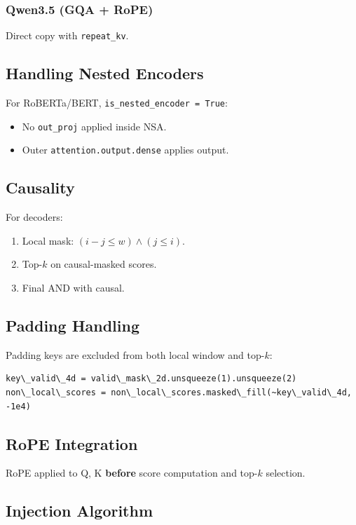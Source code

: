 \subsubsection{Qwen3.5 (GQA + RoPE)}

Direct copy with \texttt{repeat\_kv}.

\subsection{Handling Nested Encoders}

For RoBERTa/BERT, \texttt{is\_nested\_encoder = True}:
\begin{itemize}
\item No \texttt{out\_proj} applied inside NSA.
\item Outer \texttt{attention.output.dense} applies output.

\end{itemize}
\subsection{Causality}

For decoders:
\begin{enumerate}
\item Local mask: $(i - j \leq w) \land (j \leq i)$.
\item Top-$k$ on causal-masked scores.
\item Final AND with causal.

\end{enumerate}
\subsection{Padding Handling}

Padding keys are excluded from both local window and top-$k$:

\begin{lstlisting}
key\_valid\_4d = valid\_mask\_2d.unsqueeze(1).unsqueeze(2)
non\_local\_scores = non\_local\_scores.masked\_fill(~key\_valid\_4d, -1e4)
\end{lstlisting}

\subsection{RoPE Integration}

RoPE applied to Q, K \textbf{before} score computation and top-$k$ selection.

\subsection{Injection Algorithm}

